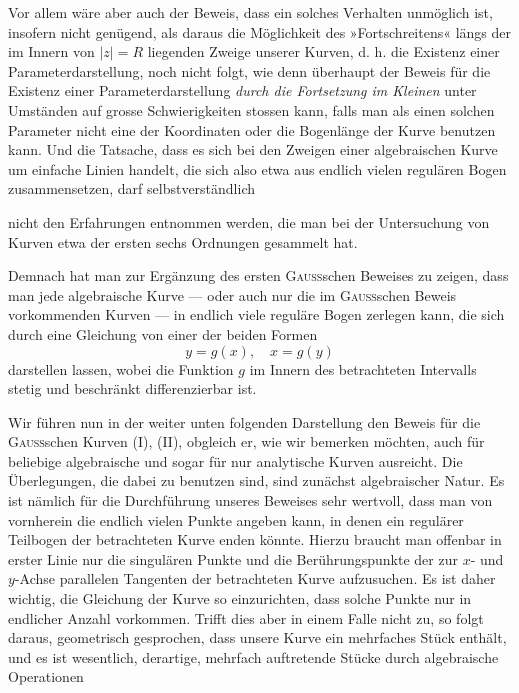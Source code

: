 Vor allem wäre aber auch der Beweis, dass ein solches Verhalten unmöglich
ist, insofern nicht genügend, als daraus die Möglichkeit des »Fortschreitens«
längs der im Innern von \(|z|=R\) liegenden Zweige unserer Kurven, d. h. die
Existenz einer Parameterdarstellung, noch nicht folgt, wie denn überhaupt
der Beweis für die Existenz einer Parameterdarstellung \textit{durch die Fortsetzung
im Kleinen} unter Umständen auf grosse Schwierigkeiten stossen kann, falls
man als einen solchen Parameter nicht eine der Koordinaten oder die Bogenlänge
der Kurve benutzen kann. Und die Tatsache, dass es sich bei den
Zweigen einer algebraischen Kurve um einfache Linien handelt, die sich also
etwa aus endlich vielen regulären Bogen zusammensetzen, darf selbstverständlich\par
\clearpage{}
\noindent nicht den Erfahrungen entnommen werden, die man bei der Untersuchung
von Kurven etwa der ersten sechs Ordnungen gesammelt hat.
\par
Demnach hat man zur Ergänzung des ersten \textsc{Gauss}schen Beweises zu zeigen,
dass man jede algebraische Kurve — oder auch nur die im \textsc{Gauss}schen Beweis
vorkommenden Kurven — in endlich viele reguläre Bogen zerlegen kann,
die sich durch eine Gleichung von einer der beiden Formen
\[
y=g(x),\quad x=g(y)
\]
darstellen lassen, wobei die Funktion \(g\) im Innern des betrachteten Intervalls
stetig und beschränkt differenzierbar ist.
\par
Wir führen nun in der weiter unten folgenden Darstellung den Beweis
für die \textsc{Gauss}schen Kurven (I), (II), obgleich er, wie wir bemerken möchten,
auch für beliebige algebraische und sogar für nur analytische Kurven ausreicht.
Die Überlegungen, die dabei zu benutzen sind, sind zunächst algebraischer
Natur. Es ist nämlich für die Durchführung unseres Beweises sehr
wertvoll, dass man von vornherein die endlich vielen Punkte angeben kann,
in denen ein regulärer Teilbogen der betrachteten Kurve enden könnte.
Hierzu braucht man offenbar in erster Linie nur die singulären Punkte und
die Berührungspunkte der zur \(x\)- und \(y\)-Achse parallelen Tangenten der betrachteten
Kurve aufzusuchen. Es ist daher wichtig, die Gleichung der Kurve
so einzurichten, dass solche Punkte nur in endlicher Anzahl vorkommen.
Trifft dies aber in einem Falle nicht zu, so folgt daraus, geometrisch gesprochen,
dass unsere Kurve ein mehrfaches Stück enthält, und es ist wesentlich,
derartige, mehrfach auftretende Stücke durch algebraische Operationen
